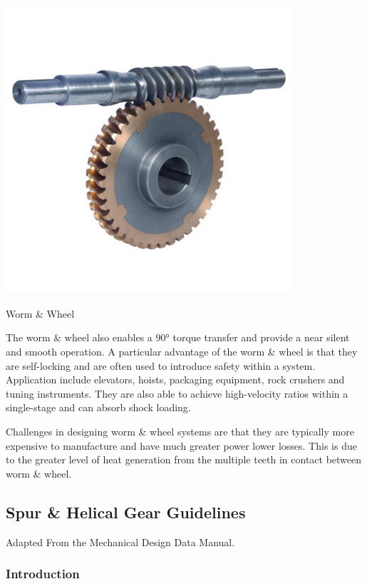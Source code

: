 \begin{marginfigure}
  \centering
  \includegraphics[width=0.8\textwidth]{figs/worm.jpg}
  \caption{Worm \& Wheel}
\end{marginfigure}
The worm \& wheel also enables a \ang{90} torque transfer and provide a near silent and smooth operation. A particular advantage of the worm \& wheel is that they are self-locking and are often used to introduce safety within a system. Application include elevators, hoists, packaging equipment, rock crushers and tuning instruments. They are also able to achieve high-velocity ratios within a single-stage and can absorb shock loading.

Challenges in designing worm \& wheel systems are that they are typically more expensive to manufacture and have much greater power lower losses. This is due to the greater level of heat generation from the multiple teeth in contact between worm \& wheel.

\subsection{Spur \& Helical Gear Guidelines}

Adapted From the Mechanical Design Data Manual.~\cite{MechanicalDesignDataManual2000}

\subsubsection{Introduction}

